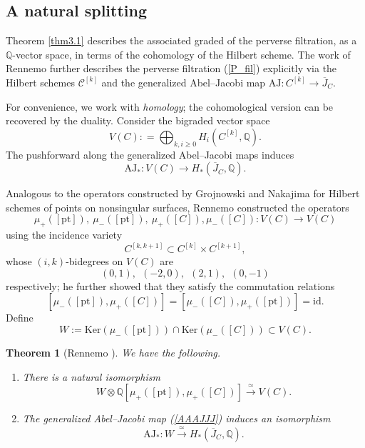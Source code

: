 \documentclass{pspum-l}
\theoremstyle{plain}
\newtheorem{thm}{Theorem}[section]
\theoremstyle{definition}
\theoremstyle{remark}
\newcommand{\BQ}{{\mathbb{Q}}}
\newcommand{\CC}{{\mathcal C}}
\begin{document}
\subsection{A natural splitting}\label{sec3.3}

Theorem \ref{thm3.1} describes the associated graded of the perverse filtration, as a $\BQ$-vector space, in terms of the cohomology of the Hilbert scheme. The work of Rennemo \cite{R} further describes the perverse filtration (\ref{P_fil}) explicitly via the Hilbert schemes $\CC^{[k]}$ and the generalized Abel--Jacobi map $\mathrm{AJ}: C^{[k]} \to \overline{J}_C$. 

For convenience, we work with \emph{homology}; the cohomological version can be recovered by the duality. Consider the bigraded vector space
\[
V(C): = \bigoplus_{k,i\geq 0} H_i(C^{[k]}, \BQ).
\]
The pushforward along the generalized Abel--Jacobi maps induces
\begin{equation}\label{AAAJJJ}
\mathrm{AJ}_*: V(C) \to H_*(\overline{J}_C, \BQ).
\end{equation}

Analogous to the operators constructed by Grojnowski and Nakajima for Hilbert schemes of points on nonsingular surfaces, Rennemo constructed the operators
\[
\mu_{+}([\mathrm{pt}]), ~ \mu_{-}([\mathrm{pt}]), ~   \mu_{+}([C]), \mu_{-}([C]) : V(C) \to V(C)
\]
using the incidence variety
\[
C^{[k,k+1]} \subset C^{[k]} \times C^{[k+1]},
\]
whose $(i,k)$-bidegrees on $V(C)$ are 
\[
(0,1), ~~ (-2,0),~~ (2,1),~~ (0,-1)
\]
respectively; he further showed that they satisfy the commutation relations
\[
[\mu_-([\mathrm{pt}]), \mu_+([C])] =  [\mu_-([C]), \mu_+([\mathrm{pt}])] = \mathrm{id}.
\]
Define   
\[
W:= \mathrm{Ker}\left(\mu_-([\mathrm{pt}]) \right) \cap \mathrm{Ker}\left( \mu_-([C]) \right) \subset V(C).
\]


\begin{thm}[Rennemo \cite{R}]\label{Thm3.3}
We have the following. 
 \begin{enumerate}
     \item[(a)] There is a natural isomorphism
     \[
     W\otimes \BQ[\mu_+([\mathrm{pt}]), \mu_+([C])] \xrightarrow{~\simeq~} V(C).
     \]
     \item[(b)] The generalized Abel--Jacobi map (\ref{AAAJJJ}) induces an isomorphism 
     \[
     \mathrm{AJ}_*: W \xrightarrow{~\simeq~} H_*(\overline{J}_C, \BQ).
     \]
 \end{enumerate}
\end{thm}
\end{document}
